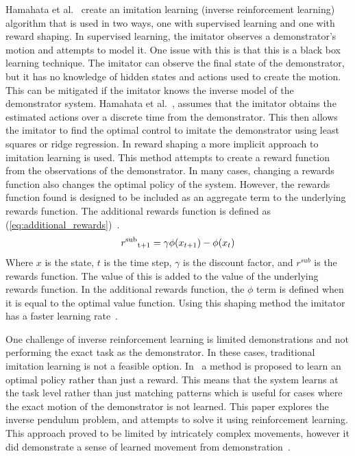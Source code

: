 \documentclass[12pt,american]{report}
\begin{document}
		Hamahata et al.~\cite{hamahata2008effective} create an imitation learning (inverse reinforcement learning) algorithm that is used in two ways, one with supervised learning and one with reward shaping. In supervised learning, the imitator observes a demonstrator's motion and attempts to model it. One issue with this is that this is a black box learning technique.  The imitator can observe the final state of the demonstrator, but it has no knowledge of hidden states and actions used to create the motion. This can be mitigated if the imitator knows the inverse model of the demonstrator system. Hamahata et al.~\cite{hamahata2008effective}, assumes that the imitator obtains the estimated actions over a discrete time from the demonstrator.  This then allows the imitator to find the optimal control to imitate the demonstrator using least squares or ridge regression. In reward shaping a more implicit approach to imitation learning is used. This method attempts to create a reward function from the observations of the demonstrator.  In many cases, changing a rewards function also changes the optimal policy of the system.  However, the rewards function found is designed to be included as an aggregate term to the underlying rewards function. The additional rewards function is defined as (\ref{eq:additional_rewards})~\cite{hamahata2008effective}.
		\begin{equation}
            \label{eq:additional_rewards}
            r\textsuperscript{sub}\textsubscript{t+1}= \gamma\phi(x_{t+1})-\phi(x_{t})
        \end{equation}
		Where $x$ is the state, $t$ is the time step, $\gamma$ is the discount factor, and $r^{sub}$ is the rewards function. The value of this is added to the value of the underlying rewards function. In the additional rewards function, the \textit{$\phi$} term is defined when it is equal to the optimal value function. Using this shaping method the imitator has a faster learning rate~\cite{hamahata2008effective}.
		
		One challenge of inverse reinforcement learning is limited demonstrations and not performing the exact task as the demonstrator. In these cases, traditional imitation learning is not a feasible option. In~\cite{atkeson1997robot} a method is proposed to learn an optimal policy rather than just a reward. This means that the system learns at the task level rather than just matching patterns which is useful for cases where the exact motion of the demonstrator is not learned. This paper explores the inverse pendulum problem, and attempts to solve it using reinforcement learning. This approach proved to be limited by intricately complex movements, however it did demonstrate a sense of learned movement from demonstration~\cite{atkeson1997robot}.
\end{document}
